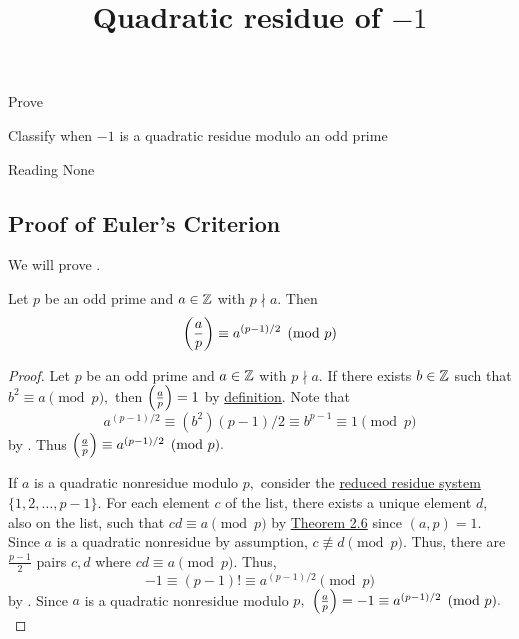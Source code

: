 \documentclass{ximera}
\title{Quadratic residue of $-1$}
\begin{document}
\begin{abstract}
\end{abstract}
\maketitle


\begin{obj}
    \item Prove 
	\item Classify when $-1$ is a quadratic residue modulo an odd prime
\end{obj}


\begin{pre}
    \item[Reading] None
\end{pre}

\subsection{Proof of Euler's Criterion}

We will prove . 

\begin{theorem}
    Let $p$ be an odd prime and $a\in\mathbb Z$ with $p\nmid a.$ Then \[\left(\frac{a}{p}\right)\equiv a^{(p-1)/2}\pmod{p}\]
\end{theorem}

\begin{proof}
	Let $p$ be an odd prime and $a\in\mathbb Z$ with $p\nmid a.$ If there exists $b\in\mathbb Z$ such that $b^2\equiv a\pmod{p},$ then $\left(\frac{a}{p}\right)=1$ by \hyperref[defn:legendre]{definition}.
	Note that \[a^{(p-1)/2}\equiv (b^2){(p-1)/2}\equiv b^{p-1}\equiv 1\pmod{p}\]
	by . Thus $\left(\frac{a}{p}\right)\equiv a^{(p-1)/2}\pmod{p}.$
	
	If $a$ is a quadratic nonresidue modulo $p,$ consider the \hyperref[defn:reduced-res-sys]{reduced residue system} $\{1,2,\dots,p-1\}.$ For each element $c$ of the list, there exists a unique element $d$, also on the list, such that $cd\equiv a\pmod{p}$ by \hyperref[thm:lin-cong-solutions]{Theorem 2.6} since $(a,p)=1$. Since $a$ is a quadratic nonresidue by assumption, $c\not\equiv d\pmod{p}.$ Thus, there are $\frac{p-1}{2}$ pairs $c,d$ where $cd\equiv a\pmod{p}.$ Thus, 
		\[
			-1\equiv (p-1)! \equiv a^{(p-1)/2}\pmod{p}
		\]
	by . Since $a$ is a quadratic nonresidue modulo $p,$ $\left(\frac{a}{p}\right)=-1\equiv a^{(p-1)/2}\pmod{p}.$
\end{proof}
\end{document}
